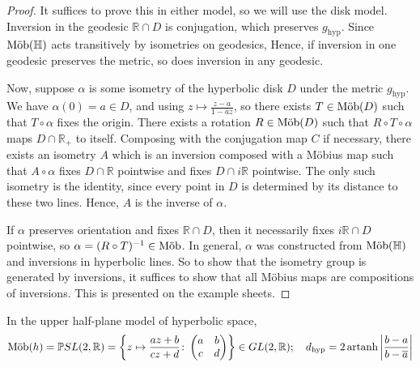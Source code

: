 \begin{proof}
	It suffices to prove this in either model, so we will use the disk model.
	Inversion in the geodesic \( \mathbb R \cap D \) is conjugation, which preserves \( g_{\text{hyp}} \).
	Since \( \text{M\"ob}(\mathbb H) \) acts transitively by isometries on geodesics,
	Hence, if inversion in one geodesic preserves the metric, so does inversion in any geodesic.

	Now, suppose \( \alpha \) is some isometry of the hyperbolic disk \( D \) under the metric \( g_{\text{hyp}} \).
	We have \( \alpha(0) = a \in D \), and using \( z \mapsto \frac{z - a}{1 - \overline a z} \), so there exists \( T \in \text{M\"ob}(D) \) such that \( T \circ \alpha \) fixes the origin.
	There exists a rotation \( R \in \text{M\"ob}(D) \) such that \( R \circ T \circ \alpha \) maps \( D \cap \mathbb R_+ \) to itself.
	Composing with the conjugation map \( C \) if necessary, there exists an isometry \( A \) which is an inversion composed with a M\"obius map such that \( A \circ \alpha \) fixes \( D \cap \mathbb R \) pointwise and fixes \( D \cap i\mathbb R \) pointwise.
	The only such isometry is the identity, since every point in \( D \) is determined by its distance to these two lines.
	Hence, \( A \) is the inverse of \( \alpha \).

	If \( \alpha \) preserves orientation and fixes \( \mathbb R \cap D \), then it necessarily fixes \( i\mathbb R \cap D \) pointwise, so \( \alpha = (R \circ T)^{-1} \in \text{M\"ob} \).
	In general, \( \alpha \) was constructed from \( \text{M\"ob}(\mathbb H) \) and inversions in hyperbolic lines.
	So to show that the isometry group is generated by inversions, it suffices to show that all M\"obius maps are compositions of inversions.
	This is presented on the example sheets.
\end{proof}
In the upper half-plane model of hyperbolic space,
\[ \text{M\"ob}(h) = \mathbb PSL(2,\mathbb R) = \qty{z \mapsto \frac{az+b}{cz+d} \colon \begin{pmatrix}
	a & b \\
	c & d
\end{pmatrix}} \in GL(2,\mathbb R);\quad d_{\text{hyp}} = 2 \operatorname{artanh} \abs{\frac{b - a}{b - \overline a}} \]

